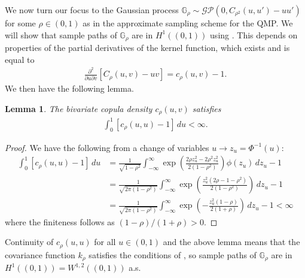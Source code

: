 \documentclass[11pt,a4paper]{article}
\newtheorem{lem}{Lemma}
\begin{document}
\begin{appendices}
We now turn our focus to the Gaussian process $\mathbb{G}_{\rho} \sim \mathcal{GP}(0,C_{\rho^2}(u,u') - uu')$ for some $\rho \in (0,1)$ as in the approximate sampling scheme for the QMP. We will show that sample paths of $\mathbb{G}_{\rho}$ are in $H^1((0,1))$ using \citet[Theorem 1]{Scheuerer2010}. This depends on properties of the partial derivatives of the kernel function, which exists and is equal to
\begin{align*}
    \frac{\partial^2}{\partial u \partial v}[C_{\rho}(u,v) - uv] = c_\rho(u,v) - 1.
\end{align*}
We then have the following lemma.
\begin{lem}
The bivariate copula density $c_{\rho}(u,v)$ satisfies
 \begin{align*}
     \int_0^1[c_\rho(u,u) - 1]\, du < \infty.
 \end{align*}
\end{lem}
\begin{proof}
   We have the following from a change of variables $u \to z_u = \Phi^{-1}(u)$:
    \begin{align*}
        \int_0^1 [c_{\rho}(u,u)-1] \, du &= \frac{1}{\sqrt{1-\rho^2}}\int_{-\infty}^{\infty}\exp\left(\frac{2\rho z_u^2 -2\rho^2z_u^2}{2(1-\rho^2)}\right)\phi(z_u)\, dz_u-1\\
        &=\frac{1}{\sqrt{2\pi(1-\rho^2)}}\int_{-\infty}^{\infty}\exp\left(\frac{ z_u^2 \left(2\rho -1 - \rho^2\right)}{2(1-\rho^2)}\right)\, dz_u-1\\
        &=\frac{1}{\sqrt{2\pi(1-\rho^2)}}\int_{-\infty}^{\infty}\exp\left(-\frac{z_u^2(1-\rho)}{2(1+\rho)}\right)\, dz_u-1 < \infty
    \end{align*}
    where the finiteness follows as $(1-\rho)/(1+\rho) > 0$. 
\end{proof}
Continuity of $c_\rho(u,u)$ for all $u \in (0,1)$ and the above lemma means that the covariance function $k_{\rho}$ satisfies the conditions of \citet[Theorem 1]{Scheuerer2010}, so sample paths of $\mathbb{G}_{\rho}$ are in $H^1((0,1)) = W^{1,2}((0,1))$ a.s. 
    


\end{appendices}
\end{document}
